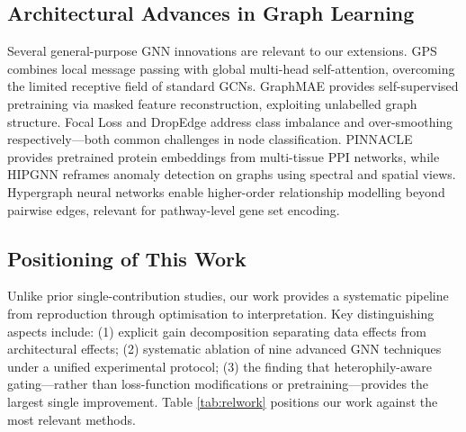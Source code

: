 \subsection{Architectural Advances in Graph Learning}

Several general-purpose GNN innovations are relevant to our extensions. GPS
\cite{gps2022} combines local message passing with global multi-head
self-attention, overcoming the limited receptive field of standard GCNs.
GraphMAE \cite{graphmae2022} provides self-supervised pretraining via masked
feature reconstruction, exploiting unlabelled graph structure. Focal Loss
\cite{focal2017} and DropEdge \cite{dropedge2020} address class imbalance and
over-smoothing respectively---both common challenges in node classification.
PINNACLE \cite{pinnacle2024} provides pretrained protein embeddings from
multi-tissue PPI networks, while HIPGNN \cite{hipgnn2025} reframes anomaly
detection on graphs using spectral and spatial views. Hypergraph neural networks
\cite{hgnn2019} enable higher-order relationship modelling beyond pairwise edges,
relevant for pathway-level gene set encoding.

\subsection{Positioning of This Work}

Unlike prior single-contribution studies, our work provides a systematic pipeline
from reproduction through optimisation to interpretation. Key distinguishing
aspects include: (1) explicit gain decomposition separating data effects from
architectural effects; (2) systematic ablation of nine advanced GNN techniques
under a unified experimental protocol; (3) the finding that heterophily-aware
gating---rather than loss-function modifications or pretraining---provides the
largest single improvement. Table \ref{tab:relwork} positions our work against
the most relevant methods.

